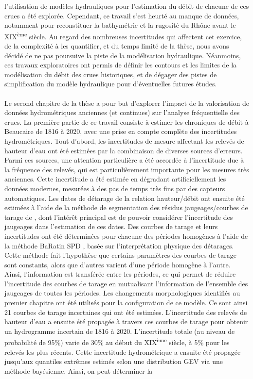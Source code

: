 l'utilisation de modèles hydrauliques pour l'estimation du débit de chacune de ces crues a été explorée. Cependant, ce travail s'est heurté au manque de données, notamment pour reconstituer la bathymétrie et la rugosité du Rhône avant le XIX\textsuperscript{ème} siècle. Au regard des nombreuses incertitudes qui affectent cet exercice, de la complexité à les quantifier, et du temps limité de la thèse, nous avons décidé de ne pas poursuive la piste de la modélisation hydraulique. Néanmoins, ces travaux exploratoires ont permis de définir les contours et les limites de la modélisation du débit des crues historiques, et de dégager des pistes de simplification du modèle hydraulique pour d'éventuelles futures études.
	
	\paragraph{} Le second chapitre de la thèse a pour but d'explorer l'impact de la valorisation de données hydrométriques anciennes (et continues) sur l'analyse fréquentielle des crues. La première partie de ce travail consiste à estimer les chroniques de débit à Beaucaire de 1816 à 2020, avec une prise en compte complète des incertitudes hydrométriques. Tout d'abord, les incertitudes de mesure affectant les relevés de hauteur d'eau ont été estimées par la combinaison de diverses sources d'erreurs. Parmi ces sources, une attention particulière a été accordée à l'incertitude due à la fréquence des relevés, qui est particulièrement importante pour les mesures très anciennes. Cette incertitude a été estimée en dégradant artificiellement les données modernes, mesurées à des pas de temps très fins par des capteurs automatiques. Les dates de détarage de la relation hauteur/débit ont ensuite été estimées à l'aide de la méthode de segmentation des résidus jaugeages/courbes de tarage de \citet{darienzo_detection_2021}, dont l'intérêt principal est de pouvoir considérer l'incertitude des jaugeages dans l'estimation de ces dates. Des courbes de tarage et leurs incertitudes ont été déterminées pour chacune des périodes homogènes à l'aide de la méthode BaRatin SPD \citep{mansanarez_shift_2019}, basée sur l'interprétation physique des détarages. Cette méthode fait l'hypothèse que certains paramètres des courbes de tarage sont constants, alors que d'autres varient d'une période homogène à l'autre. Ainsi, l'information est transférée entre les périodes, ce qui permet de réduire l'incertitude des courbes de tarage en mutualisant l'information de l'ensemble des jaugeages de toutes les périodes. Les changements morphologiques identifiés au premier chapitre ont été utilisés pour la configuration de ce modèle. Ce sont ainsi 21 courbes de tarage incertaines qui ont été estimées. L'incertitude des relevés de hauteur d'eau a ensuite été propagée à travers ces courbes de tarage pour obtenir un hydrogramme incertain de 1816 à 2020. L'incertitude totale (au niveau de probabilité de 95\%) varie de 30\% au début du XIX\textsuperscript{ème} siècle, à 5\% pour les relevés les plus récents. Cette incertitude hydrométrique a ensuite été propagée jusqu'aux quantiles extrêmes estimés selon une distribution GEV via une méthode bayésienne. Ainsi, on peut déterminer la 